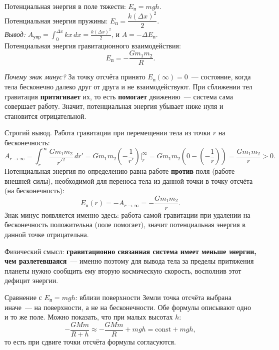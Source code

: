 \documentclass[12pt]{article}
\begin{document}
\begin{definition}
	Потенциальная энергия в поле тяжести: $E_{\text{п}} = mgh$.\\
	Потенциальная энергия пружины: $E_{\text{п}} = \dfrac{k(\Delta x)^2}{2}$.\\
	\textit{Вывод:} $A_{\text{упр}} = \int_0^{\Delta x} k x\,dx = \frac{k(\Delta x)^2}{2}$, и $A = -\Delta E_{\text{п}}$.\\
	Потенциальная энергия гравитационного взаимодействия:
    \[
    	E_{\text{п}} = -\frac{Gm_1m_2}{R}.
    \]
    
    \textit{Почему знак минус?} За точку отсчёта принято $E_{\text{п}}(\infty) = 0$~---
    состояние, когда тела бесконечно далеко друг от друга и не взаимодействуют.
    При сближении тел гравитация \textbf{притягивает} их, то есть \textbf{помогает}
    движению~--- система сама совершает работу. Значит, потенциальная энергия
    убывает ниже нуля и становится отрицательной.
    
    Строгий вывод. Работа гравитации при перемещении тела из точки $r$ на
    бесконечность:
    \[
    	A_{r \to \infty} = \int_r^{\infty} \frac{Gm_1m_2}{r'^2}\,dr'
    	= Gm_1m_2\left(-\frac{1}{r'}\right)\Bigg|_r^{\infty}
    	= Gm_1m_2\left(0 - \left(-\frac{1}{r}\right)\right)
    	= \frac{Gm_1m_2}{r} > 0.
    \]
    Потенциальная энергия по определению равна работе \textbf{против} поля
    (работе внешней силы), необходимой для переноса тела из данной точки
    в точку отсчёта (на бесконечность):
    \[
    	E_{\text{п}}(r) = -A_{r \to \infty} = -\frac{Gm_1m_2}{r}.
    \]
    Знак минус появляется именно здесь: работа самой гравитации при удалении
    на бесконечность положительна (поле помогает), значит потенциальная
    энергия в данной точке отрицательна.
    
    Физический смысл: \textbf{гравитационно связанная система имеет меньше
    энергии, чем разлетевшаяся}~--- именно поэтому для вывода тела за пределы
    притяжения планеты нужно сообщить ему вторую космическую скорость,
    восполнив этот дефицит энергии.
    
    Сравнение с $E_{\text{п}} = mgh$: вблизи поверхности Земли точка отсчёта
    выбрана иначе~--- на поверхности, а не на бесконечности. Обе формулы
    описывают одно и то же поле. Можно показать, что при малых высотах $h$:
    \[
    	-\frac{GMm}{R+h} \approx -\frac{GMm}{R} + mgh = \text{const} + mgh,
    \]
    то есть при сдвиге точки отсчёта формулы согласуются.
\end{definition}
\end{document}
